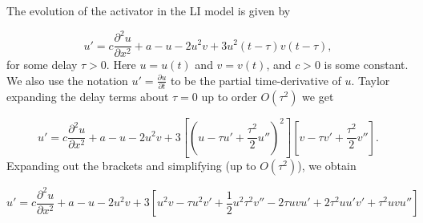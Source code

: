 \documentclass[12pt,a4paper]{article}
\begin{document}
The evolution of the activator in the LI model is given by

\begin{equation}
u'=c\frac{\partial^2u}{\partial x^2}+a-u-2u^2v+3u^2(t-\tau)v(t-\tau),
\end{equation}
for some delay $\tau>0$. Here $u=u(t)$ and $v=v(t)$, and $c>0$ is some constant. We also use the notation $u'=\frac{\partial u}{\partial t}$ to be the partial time-derivative of $u$.
Taylor expanding the delay terms about $\tau=0$ up to order $O(\tau^2)$ we get

\begin{equation}
u'=c\frac{\partial^2u}{\partial x^2}+a-u-2u^2v+3\left[\left(u-\tau u'+\frac{\tau^2}{2}u''\right)^2\right]\left[v-\tau v'+\frac{\tau^2}{2}v''\right].
\end{equation}
Expanding out the brackets and simplifying (up to $O(\tau^2)$), we obtain

\begin{equation}
u'=c\frac{\partial^2u}{\partial x^2}+a-u-2u^2v+3\left[u^2v-\tau u^2v'+\frac{1}{2}u^2\tau^2v''-2\tau uvu'+2\tau^2uu'v'+\tau^2uvu''\right]
\end{equation}
\end{document}
